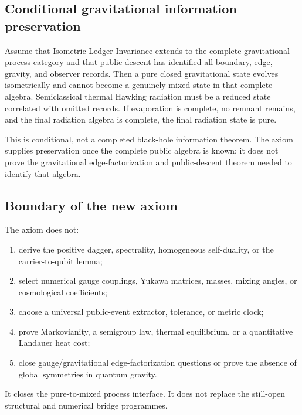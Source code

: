 \subsection{Conditional gravitational information preservation}

\begin{proposition}
\label{prop:conditional-black-hole-information-ledger}
Assume that Isometric Ledger Invariance extends to the complete gravitational
process category and that public descent has identified all boundary, edge,
gravity, and observer records.  Then a pure closed gravitational state evolves
isometrically and cannot become a genuinely mixed state in that complete algebra.
Semiclassical thermal Hawking radiation must be a reduced state correlated with
omitted records.  If evaporation is complete, no remnant remains, and the final
radiation algebra is complete, the final radiation state is pure.
\end{proposition}

\begin{remark}
This is conditional, not a completed black-hole information theorem.  The axiom
supplies preservation once the complete public algebra is known; it does not prove
the gravitational edge-factorization and public-descent theorem needed to identify
that algebra.
\end{remark}

\subsection{Boundary of the new axiom}

\begin{proposition}
\label{prop:ledger-invariance-boundary}
The axiom does not:
\begin{enumerate}[label=\textup{(\roman*)},leftmargin=2.2em]
\item derive the positive dagger, spectrality, homogeneous self-duality, or the
      carrier-to-qubit lemma;
\item select numerical gauge couplings, Yukawa matrices, masses, mixing angles, or
      cosmological coefficients;
\item choose a universal public-event extractor, tolerance, or metric clock;
\item prove Markovianity, a semigroup law, thermal equilibrium, or a quantitative
      Landauer heat cost;
\item close gauge/gravitational edge-factorization questions or prove the absence
      of global symmetries in quantum gravity.
\end{enumerate}
It closes the pure-to-mixed process interface.  It does not replace the still-open
structural and numerical bridge programmes.
\end{proposition}

